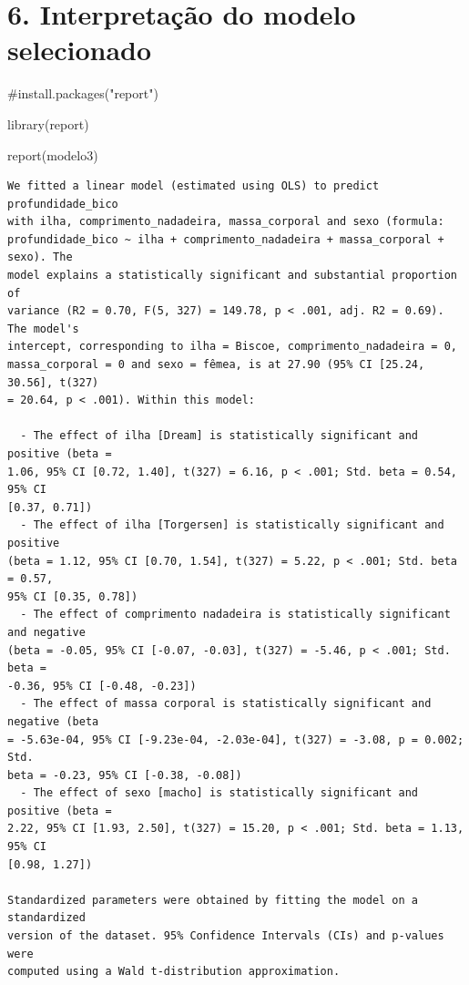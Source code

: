 \documentclass[
  letterpaper,
  DIV=11,
  numbers=noendperiod]{scrartcl}
\newenvironment{Shaded}{\begin{snugshade}}{\end{snugshade}}
\newcommand{\CommentTok}[1]{\textcolor[rgb]{0.37,0.37,0.37}{#1}}
\newcommand{\FunctionTok}[1]{\textcolor[rgb]{0.28,0.35,0.67}{#1}}
\newcommand{\NormalTok}[1]{\textcolor[rgb]{0.00,0.23,0.31}{#1}}
\begin{document}
\section{6. Interpretação do modelo
selecionado}\label{interpretauxe7uxe3o-do-modelo-selecionado}

\begin{Shaded}
\begin{Highlighting}[]
\CommentTok{\#install.packages("report")}

\FunctionTok{library}\NormalTok{(report)}

\FunctionTok{report}\NormalTok{(modelo3)}
\end{Highlighting}
\end{Shaded}

\begin{verbatim}
We fitted a linear model (estimated using OLS) to predict profundidade_bico
with ilha, comprimento_nadadeira, massa_corporal and sexo (formula:
profundidade_bico ~ ilha + comprimento_nadadeira + massa_corporal + sexo). The
model explains a statistically significant and substantial proportion of
variance (R2 = 0.70, F(5, 327) = 149.78, p < .001, adj. R2 = 0.69). The model's
intercept, corresponding to ilha = Biscoe, comprimento_nadadeira = 0,
massa_corporal = 0 and sexo = fêmea, is at 27.90 (95% CI [25.24, 30.56], t(327)
= 20.64, p < .001). Within this model:

  - The effect of ilha [Dream] is statistically significant and positive (beta =
1.06, 95% CI [0.72, 1.40], t(327) = 6.16, p < .001; Std. beta = 0.54, 95% CI
[0.37, 0.71])
  - The effect of ilha [Torgersen] is statistically significant and positive
(beta = 1.12, 95% CI [0.70, 1.54], t(327) = 5.22, p < .001; Std. beta = 0.57,
95% CI [0.35, 0.78])
  - The effect of comprimento nadadeira is statistically significant and negative
(beta = -0.05, 95% CI [-0.07, -0.03], t(327) = -5.46, p < .001; Std. beta =
-0.36, 95% CI [-0.48, -0.23])
  - The effect of massa corporal is statistically significant and negative (beta
= -5.63e-04, 95% CI [-9.23e-04, -2.03e-04], t(327) = -3.08, p = 0.002; Std.
beta = -0.23, 95% CI [-0.38, -0.08])
  - The effect of sexo [macho] is statistically significant and positive (beta =
2.22, 95% CI [1.93, 2.50], t(327) = 15.20, p < .001; Std. beta = 1.13, 95% CI
[0.98, 1.27])

Standardized parameters were obtained by fitting the model on a standardized
version of the dataset. 95% Confidence Intervals (CIs) and p-values were
computed using a Wald t-distribution approximation.
\end{verbatim}
\end{document}
